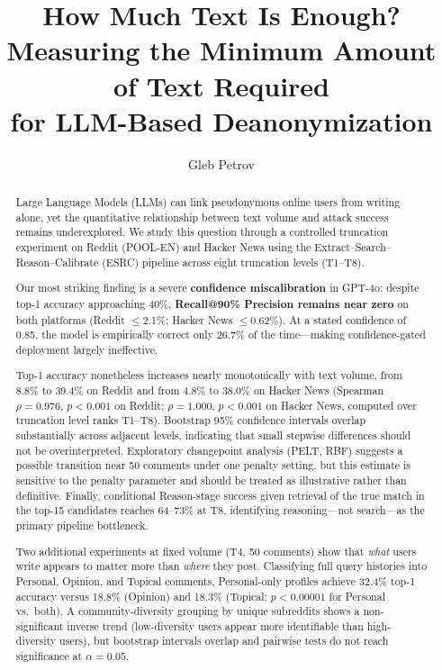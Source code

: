\documentclass[sigplan,screen,nonacm]{acmart}
\title{How Much Text Is Enough?\\
Measuring the Minimum Amount of Text Required\\for LLM-Based Deanonymization}
\author{Gleb Petrov}
\affiliation{\institution{University of Luxembourg}}
\begin{document}
\begin{abstract}
Large Language Models (LLMs) can link pseudonymous online users from writing alone,
yet the quantitative relationship between text volume and attack success remains
underexplored. We study this question through a controlled truncation experiment on
Reddit (POOL-EN) and Hacker News using the Extract--Search--Reason--Calibrate (ESRC)
pipeline across eight truncation levels (T1--T8).

Our most striking finding is a severe \textbf{confidence miscalibration} in GPT-4o:
despite top-1 accuracy approaching 40\%, \textbf{Recall@90\% Precision remains near
zero} on both platforms (Reddit $\leq$2.1\%; Hacker News $\leq$0.62\%). At a stated
confidence of 0.85, the model is empirically correct only 26.7\% of the
time---making confidence-gated deployment largely ineffective.

Top-1 accuracy nonetheless increases nearly monotonically with text volume, from
8.8\% to 39.4\% on Reddit and from 4.8\% to 38.0\% on Hacker News (Spearman
$\rho = 0.976$, $p < 0.001$ on Reddit; $\rho = 1.000$, $p < 0.001$ on Hacker News,
computed over truncation level ranks T1--T8). Bootstrap 95\% confidence intervals overlap
substantially across adjacent levels, indicating that small stepwise differences
should not be overinterpreted. Exploratory changepoint analysis (PELT, RBF) suggests a
possible transition near 50 comments under one penalty setting, but this estimate is
sensitive to the penalty parameter and should be treated as illustrative rather than
definitive. Finally, conditional Reason-stage success given retrieval of the true
match in the top-15 candidates reaches 64--73\% at T8, identifying reasoning---not
search---as the primary pipeline bottleneck.

Two additional experiments at fixed volume (T4, 50 comments) show that \textit{what}
users write appears to matter more than \textit{where} they post. Classifying full query
histories into Personal, Opinion, and Topical comments, Personal-only profiles
achieve 32.4\% top-1 accuracy versus 18.8\% (Opinion) and 18.3\% (Topical;
$p < 0.00001$ for Personal vs.\ both). A community-diversity grouping by unique
subreddits shows a non-significant inverse trend (low-diversity users appear more
identifiable than high-diversity users), but bootstrap intervals overlap and pairwise
tests do not reach significance at $\alpha = 0.05$.
\end{abstract}

\maketitle
\end{document}
